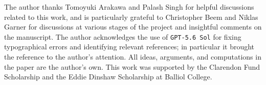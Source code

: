 \documentclass[a4paper,dvipsnames,11pt]{article}
\begin{document}
\maketitle
\flushbottom







%


\acknowledgments

The author thanks Tomoyuki Arakawa and Palash Singh for helpful discussions related to this work, and is particularly grateful to Christopher Beem and Niklas Garner for discussions at various stages of the project and insightful comments on the manuscript. The author acknowledges the use of \texttt{GPT-5.6 Sol} for fixing typographical errors and identifying relevant references; in particular it brought the reference \cite{panyushev2007semi} to the author's attention. All ideas, arguments, and computations in the paper are the author's own. This work was supported by the Clarendon Fund Scholarship and the Eddie Dinshaw Scholarship at Balliol College. 



\vfill\eject

\appendix




\end{document}

